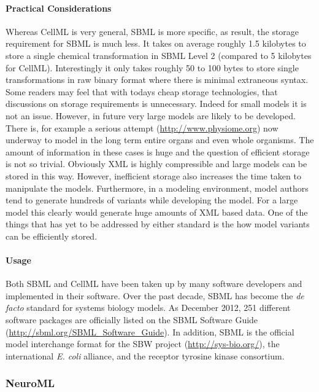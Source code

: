 \documentclass[]{article}
\begin{document}
\paragraph{Practical Considerations}

Whereas CellML is very general, SBML is more specific, as result, the
storage requirement for SBML is much less. It takes on average roughly
1.5 kilobytes to store a single chemical transformation in SBML Level 2
(compared to 5 kilobytes for CellML). Interestingly it only takes
roughly 50 to 100 bytes to store single transformations in raw binary
format where there is minimal extraneous syntax. Some readers may feel
that with todays cheap storage technologies, that discussions on storage
requirements is unnecessary. Indeed for small models it is not an issue.
However, in future very large models are likely to be developed. There
is, for example a serious attempt (\url{http://www.physiome.org}) now
underway to model in the long term entire organs and even whole
organisms. The amount of information in these cases is huge and the
question of efficient storage is not so trivial. Obviously XML is highly
compressible and large models can be stored in this way. However,
inefficient storage also increases the time taken to manipulate the
models. Furthermore, in a modeling environment, model authors tend to
generate hundreds of variants while developing the model. For a large
model this clearly would generate huge amounts of XML based data. One of
the things that has yet to be addressed by either standard is the how
model variants can be efficiently stored.

\paragraph{Usage}

Both SBML and CellML have been taken up by many software developers and
implemented in their software. Over the past decade, SBML has become the
\emph{de facto} standard for systems biology models. As December 2012,
251 different software packages are officially listed on the SBML
Software Guide (\url{http://sbml.org/SBML_Software_Guide}). In addition,
SBML is the official model interchange format for the SBW project
(\url{http://sys-bio.org/}), the international \emph{E. coli} alliance,
and the receptor tyrosine kinase consortium.

\subsubsection{NeuroML}
\end{document}
